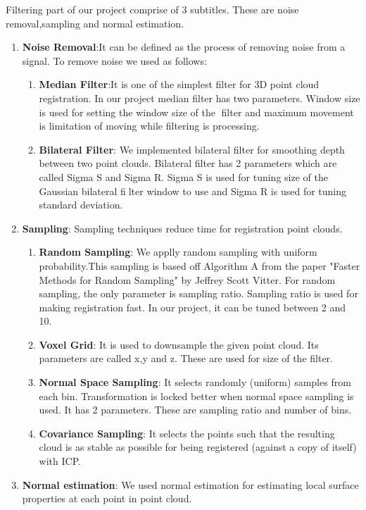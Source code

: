 \documentclass[aps,letterpaper,11pt]{revtex4}
\begin{document}
Filtering part of our project comprise of 3 subtitles. These are noise removal,sampling and normal estimation.
\begin{enumerate}
  \item \textbf{Noise Removal}:It can be defined as  the process of removing noise from a signal. To remove noise we used as follows:
\begin{enumerate}
  \item \textbf{Median Filter}:It is one of the simplest filter for 3D point cloud registration. In our project median filter has two parameters. Window size is used for setting the window  size of the filter and maximum movement is  limitation of moving while filtering is processing.
  \item \textbf{Bilateral Filter}: We implemented bilateral filter for smoothing depth between two point clouds. Bilateral filter has 2 parameters which are called Sigma S and Sigma R. Sigma S is used for tuning  size of the Gaussian bilateral filter window to use and Sigma R is used for tuning standard deviation.
\end{enumerate}
\item \textbf{Sampling}: Sampling techniques reduce time for registration point clouds.
\begin{enumerate}
  \item \textbf{Random Sampling}: We applly random sampling with uniform probability.This sampling is based off Algorithm A from the paper "Faster Methods for Random Sampling" by Jeffrey Scott Vitter. For random sampling, the only parameter is sampling ratio. Sampling ratio is used for making registration fast. In our project, it can be tuned between 2 and 10.
  \item \textbf{Voxel Grid}: It is used to downsample the given point cloud. Its parameters are called x,y and z. These are used for size of the filter.
 \item \textbf{Normal Space Sampling}: It selects randomly (uniform)  samples from each bin.  Transformation is locked better when normal space sampling is used. It has 2 parameters. These are sampling ratio and number of bins. 
 \item \textbf{Covariance Sampling}: It selects the points such that the resulting cloud is as stable as possible for being registered (against a copy of itself) with ICP.
\end{enumerate}
 \item \textbf{Normal estimation}: We used normal estimation for estimating  local surface properties at each point in point cloud.
\end{enumerate}
\end{document}
